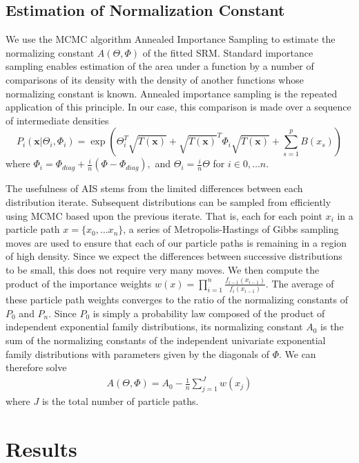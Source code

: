 \documentclass{samkoelleprelimworking}
\begin{document}
\subsection{Estimation of Normalization Constant}
We use the MCMC algorithm Annealed Importance Sampling to estimate the normalizing constant $A(\Theta, \Phi)$ of the fitted SRM.  Standard importance sampling enables estimation of the area under a function by a number of comparisons of its density with the density of another functions whose normalizing constant is known.   Annealed importance sampling is the repeated application of this principle.  In our case, this comparison is made over a sequence of intermediate densities
\[P_i(\bm{x} \vert \Theta_i, \Phi_i) =  \exp(\Theta_i^T \sqrt{T(\bm{x})} + \sqrt{T(\bm{x})}^T\Phi_i \sqrt{T(\bm{x})} + \sum_{s=1}^p B(x_s)) \]
where $\Phi_i = \Phi_{diag} + \frac{i}{n} (\Phi - \Phi_{diag}),$ and $\Theta_i = \frac{i}{n}{\Theta}$ for $i \in 0, \dotsc n$.  

The usefulness of AIS stems from the limited differences between each distribution iterate.  Subsequent distributions can be sampled from efficiently using MCMC based upon the previous iterate.  That is, each for each point $x_i$ in a particle path $x = \{x_0, \dotsc x_n\}$, a series of Metropolis-Hastings of Gibbs sampling moves are used to ensure that each of our particle paths is remaining in a region of high density.  Since we expect the differences between successive distributions to be small, this does not require very many moves.  We then compute the product of the importance weights $w(x) = \prod_{i=1}^n \frac{f_{i-1}(x_{i-1})}{f_{i}(x_{i-1})}$.  The average of these particle path weights converges to the ratio of the normalizing constants of $P_0$ and $P_n$.  Since $P_0$ is simply a probability law composed of the product of independent exponential family distributions, its normalizing constant $A_0$ is the sum of the normalizing constants of the independent univariate exponential family distributions with parameters given by the diagonals of $\Phi$.  We can therefore solve
\begin{align}
A(\Theta,\Phi) = A_0 - \frac{1}{n} \sum_{j=1}^{J} w(x_j)
\end{align}
where $J$ is the total number of particle paths.  



 \section{Results} 
 
\end{document}
